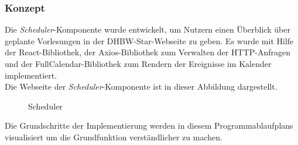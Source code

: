 \subsubsection{Konzept}
Die \emph{Scheduler}-Komponente wurde entwickelt, um Nutzern einen Überblick über geplante Vorlesungen in der DHBW-Star-Webseite zu geben. Es wurde mit Hilfe der React-Bibliothek, der Axios-Bibliothek zum Verwalten der HTTP-Anfragen und der FullCalendar-Bibliothek zum Rendern der Ereignisse im Kalender implementiert.\\
Die Webseite der \emph{Scheduler}-Komponente ist in dieser Abbildung dargestellt.

\begin{figure}[htbp]
	\centering
	\caption{Scheduler}
\end{figure}
\newpage
Die Grundschritte der Implementierung werden in diesem Programmablaufplans visualisiert um die Grundfunktion verständlicher zu machen.
